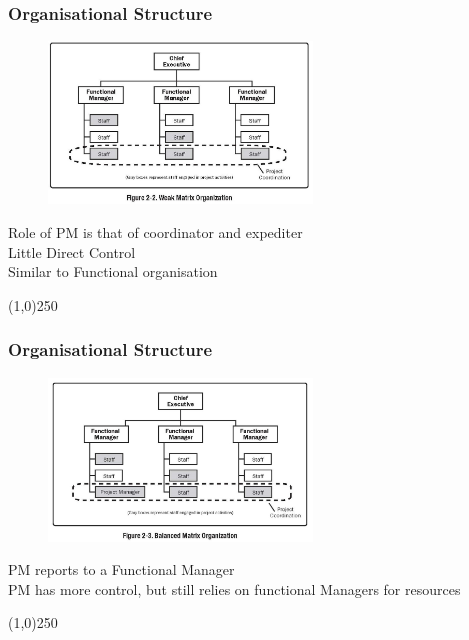 \begin{frame}
\frametitle{Organisational Structure}
\begin{figure}
	\centering
		\includegraphics[width = 7cm]{images/Fig2-2.jpg}
	\label{fig:2-2}
\end{figure}Role of PM is that of coordinator and expediter\\
Little Direct Control\\
Similar to Functional organisation\\
\end{frame}
\begin{center}\line(1,0){250}\end{center}



\begin{frame}
\frametitle{Organisational Structure}
\begin{figure}
	\centering
		\includegraphics[width = 7cm]{images/Fig2-3.jpg}
	\label{fig:2-3}
\end{figure}PM reports to a Functional Manager\\
PM has more control, but still relies on functional Managers for resources\\
\end{frame}
\begin{center}\line(1,0){250}\end{center}



